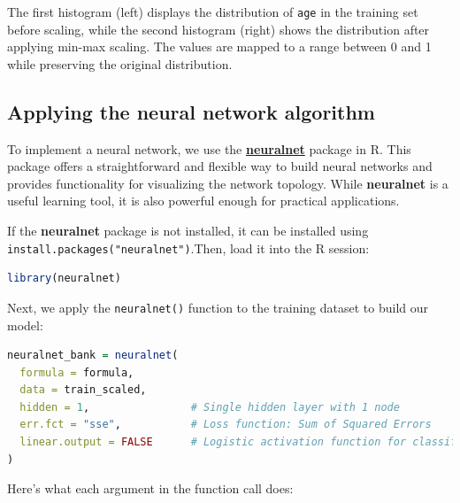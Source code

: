 \documentclass[
]{book}
\newcommand{\passthrough}[1]{#1}
\theoremstyle{definition}
\theoremstyle{definition}
\theoremstyle{definition}
\theoremstyle{definition}
\theoremstyle{remark}
\begin{document}
The first histogram (left) displays the distribution of \passthrough{\lstinline!age!} in the training set before scaling, while the second histogram (right) shows the distribution after applying min-max scaling. The values are mapped to a range between 0 and 1 while preserving the original distribution.

\subsection*{Applying the neural network algorithm}\label{applying-the-neural-network-algorithm}

To implement a neural network, we use the \href{https://CRAN.R-project.org/package=neuralnet}{\textbf{neuralnet}} package in R. This package offers a straightforward and flexible way to build neural networks and provides functionality for visualizing the network topology. While \textbf{neuralnet} is a useful learning tool, it is also powerful enough for practical applications.

If the \textbf{neuralnet} package is not installed, it can be installed using \passthrough{\lstinline!install.packages("neuralnet")!}.Then, load it into the R session:

\begin{lstlisting}[language=R]
library(neuralnet)
\end{lstlisting}

Next, we apply the \passthrough{\lstinline!neuralnet()!} function to the training dataset to build our model:

\begin{lstlisting}[language=R]
neuralnet_bank = neuralnet(
  formula = formula,
  data = train_scaled,
  hidden = 1,                # Single hidden layer with 1 node
  err.fct = "sse",           # Loss function: Sum of Squared Errors
  linear.output = FALSE      # Logistic activation function for classification
)
\end{lstlisting}

Here's what each argument in the function call does:
\end{document}
